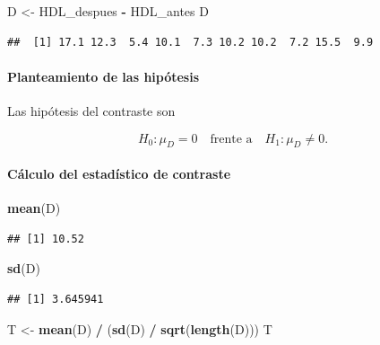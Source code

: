 \documentclass[
]{article}
\newenvironment{Shaded}{\begin{snugshade}}{\end{snugshade}}
\newcommand{\FunctionTok}[1]{\textcolor[rgb]{0.13,0.29,0.53}{\textbf{#1}}}
\newcommand{\NormalTok}[1]{#1}
\newcommand{\OtherTok}[1]{\textcolor[rgb]{0.56,0.35,0.01}{#1}}
\newcommand{\SpecialCharTok}[1]{\textcolor[rgb]{0.81,0.36,0.00}{\textbf{#1}}}
\begin{document}
\begin{Shaded}
\begin{Highlighting}[]
\NormalTok{D }\OtherTok{\textless{}{-}}\NormalTok{ HDL\_despues }\SpecialCharTok{{-}}\NormalTok{ HDL\_antes}
\NormalTok{D}
\end{Highlighting}
\end{Shaded}

\begin{verbatim}
##  [1] 17.1 12.3  5.4 10.1  7.3 10.2 10.2  7.2 15.5  9.9
\end{verbatim}

\paragraph{Planteamiento de las hipótesis}\label{planteamiento-de-las-hipuxf3tesis}

Las hipótesis del contraste son

\[
H_0: \mu_D = 0
\quad \text{frente a} \quad
H_1: \mu_D \neq 0.
\]

\paragraph{Cálculo del estadístico de contraste}\label{cuxe1lculo-del-estaduxedstico-de-contraste}

\begin{Shaded}
\begin{Highlighting}[]
\FunctionTok{mean}\NormalTok{(D)}
\end{Highlighting}
\end{Shaded}

\begin{verbatim}
## [1] 10.52
\end{verbatim}

\begin{Shaded}
\begin{Highlighting}[]
\FunctionTok{sd}\NormalTok{(D)}
\end{Highlighting}
\end{Shaded}

\begin{verbatim}
## [1] 3.645941
\end{verbatim}

\begin{Shaded}
\begin{Highlighting}[]
\NormalTok{T }\OtherTok{\textless{}{-}} \FunctionTok{mean}\NormalTok{(D) }\SpecialCharTok{/}\NormalTok{ (}\FunctionTok{sd}\NormalTok{(D) }\SpecialCharTok{/} \FunctionTok{sqrt}\NormalTok{(}\FunctionTok{length}\NormalTok{(D)))}
\NormalTok{T}
\end{Highlighting}
\end{Shaded}
\end{document}
